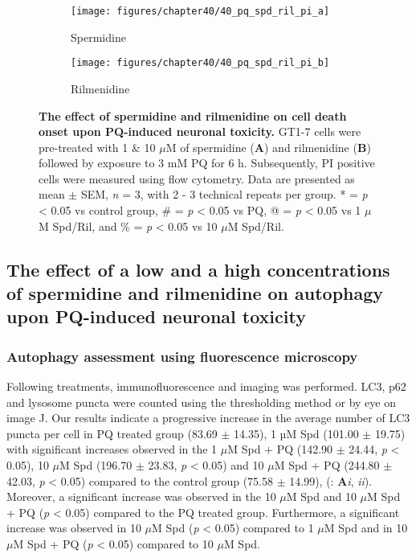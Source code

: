 \begin{figure}[!htbp]
  \center
  \begin{subfigure}[b]{0.495\linewidth}
    \texttt{[image: figures/chapter40/40\_pq\_spd\_ril\_pi\_a]}
    \caption{Spermidine}
  \end{subfigure}
  \begin{subfigure}[b]{0.495\linewidth}
    \texttt{[image: figures/chapter40/40\_pq\_spd\_ril\_pi\_b]}
    \caption{Rilmenidine}
  \end{subfigure}
  \caption[The effect of spermidine and rilmenidine on cell death onset upon PQ-induced neuronal toxicity]{\textbf{The effect of spermidine and rilmenidine on cell death onset upon PQ-induced neuronal toxicity.} GT1-7 cells were pre-treated with 1 \& 10 $\mu$M of spermidine (\textbf{A}) and rilmenidine (\textbf{B}) followed by exposure to 3 mM PQ for 6 h. Subsequently, PI positive cells were measured using flow cytometry. Data are presented as mean $\pm$ SEM, \textit{n} = 3, with 2 - 3 technical repeats per group. * = \textit{p} < 0.05 vs control group, \# = \textit{p} < 0.05 vs PQ, @ = \textit{p} < 0.05 vs 1 $\mu$M Spd/Ril, and \% = \textit{p} < 0.05 vs 10 $\mu$M Spd/Ril.}
  \label{fig:40_pq_spd_ril_pi_a}
\end{figure}

\subsection{The effect of a low and a high concentrations of spermidine and rilmenidine on autophagy upon PQ-induced neuronal toxicity} 
\subsubsection{Autophagy assessment using fluorescence microscopy}
Following treatments, immunofluorescence and imaging was performed. LC3, p62 and lysosome puncta were counted using the thresholding method or by eye on image J. Our results indicate a progressive increase in the average number of LC3 puncta per cell in PQ treated group (83.69 $\pm$ 14.35), 1 µM Spd (101.00 $\pm$ 19.75) with significant increases observed in the 1 $\mu$M Spd + PQ (142.90 $\pm$ 24.44, \textit{p} < 0.05), 10 $\mu$M Spd (196.70 $\pm$ 23.83, \textit{p} < 0.05) and 10 $\mu$M Spd + PQ (244.80 $\pm$ 42.03, \textit{p} < 0.05) compared to the control group (75.58 $\pm$ 14.99), (: \textbf{A}\textit{i}, \textit{ii}). Moreover, a significant increase was observed in the 10 $\mu$M Spd and 10 $\mu$M Spd + PQ (\textit{p} < 0.05) compared to the PQ treated group. Furthermore, a significant increase was observed in 10 $\mu$M Spd (\textit{p} < 0.05) compared to 1 $\mu$M Spd  and in 10 $\mu$M Spd + PQ (\textit{p} < 0.05) compared to 10 $\mu$M Spd.


